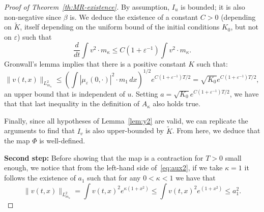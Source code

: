\documentclass[onefignum,onetabnum]{siamart190516}
\newcommand{\1}{\mathbbm{1}}
\newcommand{\eps}{\varepsilon}
\begin{document}
\begin{proof}[Proof of Theorem~\ref{th:MR-existence}]
By assumption, $I_u$ is bounded; it is also non-negative since $\beta$ is. We deduce the existence of a constant $C>0$ (depending on $\tilde K$, itself depending on the uniform bound of the initial conditions $K_0$, but not on $\eps$) such that
$$
\frac{d}{dt}\int v^2\cdot {m_\kappa} \leq C(1+\eps^{-1})\int v^2\cdot {m_\kappa}.
$$
Gronwall's lemma implies that there is a positive constant $K$ such that:
\begin{equation}
\label{eq:aux2}
\|v(t,x)\|_{L^2_{m_\kappa}} \leq \left(\int |\mu_\eps(0,\cdot)|^2\cdot {m_1}\,dx \right)^{1/2}e^{C(1+\eps^{-1})T/2}=\sqrt{K_0}e^{C(1+\eps^{-1})T/2},
\end{equation}
an upper bound that is independent of $u$. Setting $a=\sqrt{K_0}e^{C(1+\eps^{-1})T/2}$, we have that that last inequality in the definition of $A_\kappa$ also holds true.

Finally, since all hypotheses of Lemma~\ref{lem:y2} are valid, we can replicate the arguments to find that $I_v$ is also upper-bounded by $\tilde K$. From here, we deduce that the map $\Phi$ is well-defined. 
\smallskip

\noindent\textbf{Second step:} Before showing that the map is a contraction for $T>0$ small enough, we notice that from the left-hand side of~\eqref{eq:aux2}, if we take $\kappa=1$ it follows the existence of $a_1$ such that for any $0<\kappa<1$ we have that
$$
\|v(t,x)\|_{L^2_{m_\kappa}}=\int v(t,x)^2e^{\kappa(1+x^2)} \leq \int v(t,x)^2e^{(1+x^2)}  \leq a_1^2.
$$ 


\end{proof}
\end{document}
